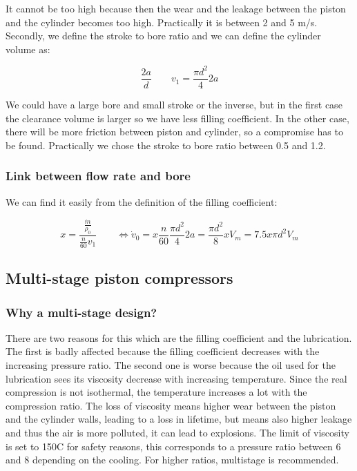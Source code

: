 It cannot be too high because then the wear and the leakage between the piston and the cylinder becomes too high. Practically it is between 2 and 5 m/s. Secondly, we define the stroke to bore ratio and we can define the cylinder volume as:  

\begin{equation}
\frac{2a}{d} \qquad v_1 = \frac{\pi d^2}{4}2a
\end{equation}

We could have a large bore and small stroke or the inverse, but in the first case the clearance volume is larger so we have less filling coefficient. In the other case, there will be more friction between piston and cylinder, so a compromise has to be found. Practically we chose the stroke to bore ratio between 0.5 and 1.2. 

\subsubsection{Link between flow rate and bore}
We can find it easily from the definition of the filling coefficient: 

\begin{equation}
x= \frac{\frac{\dot{m}}{\rho _0}}{\frac{n}{60}v_1}\qquad  \Leftrightarrow \dot{v}_0 = x \frac{n}{60} \frac{\pi d^2}{4}2a = \frac{\pi d^2}{8}x V_m = 7.5 x\pi d^2 V_m
\end{equation}

\subsection{Multi-stage piston compressors}
\subsubsection{Why a multi-stage design?}
There are two reasons for this which are the filling coefficient and the lubrication. The first is badly affected because the filling coefficient decreases with the increasing pressure ratio. The second one is worse because the oil used for the lubrication sees its viscosity decrease with increasing temperature. Since the real compression is not isothermal, the temperature increases a lot with the compression ratio. The loss of viscosity means higher wear between the piston and the cylinder walls, leading to a loss in lifetime, but means also higher leakage and thus the air is more polluted, it can lead to explosions. The limit of viscosity is set to 150\degres C for safety reasons, this corresponds to a pressure ratio between 6 and 8 depending on the cooling. For higher ratios, multistage is recommended.


